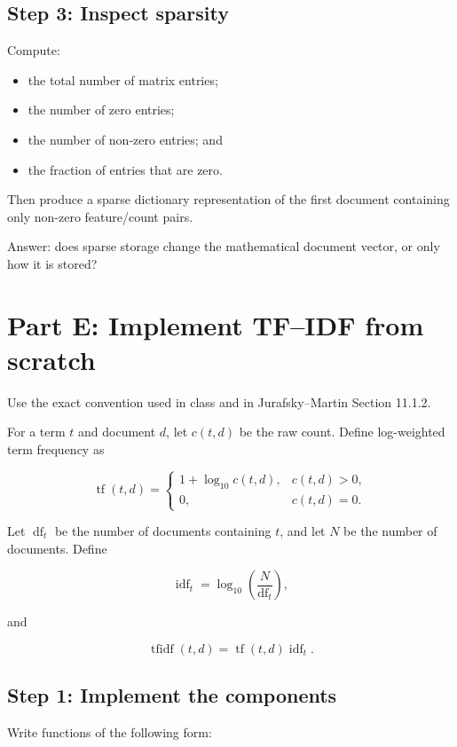\documentclass[11pt,a4paper]{article}
\begin{document}
\subsection{Step 3: Inspect sparsity}

Compute:

\begin{itemize}
  \item the total number of matrix entries;
  \item the number of zero entries;
  \item the number of non-zero entries; and
  \item the fraction of entries that are zero.
\end{itemize}

Then produce a sparse dictionary representation of the first document containing only non-zero feature/count pairs.

Answer: does sparse storage change the mathematical document vector, or only how it is stored?

\section{Part E: Implement TF--IDF from scratch}

Use the exact convention used in class and in Jurafsky--Martin Section 11.1.2.

For a term $t$ and document $d$, let $c(t,d)$ be the raw count. Define log-weighted term frequency as

\[
\operatorname{tf}(t,d)=
\begin{cases}
1+\log_{10} c(t,d), & c(t,d)>0,\\
0, & c(t,d)=0.
\end{cases}
\]

Let $\operatorname{df}_t$ be the number of documents containing $t$, and let $N$ be the number of documents. Define

\[
\operatorname{idf}_t = \log_{10}\left(\frac{N}{\operatorname{df}_t}\right),
\]

and

\[
\operatorname{tfidf}(t,d) = \operatorname{tf}(t,d)\operatorname{idf}_t.
\]

\subsection{Step 1: Implement the components}

Write functions of the following form:
\end{document}
